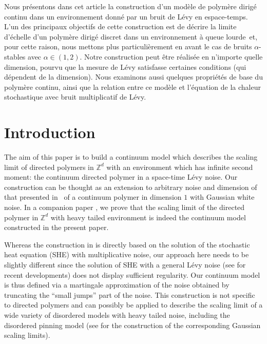 \documentclass[JEP,XML,SOM,Unicode,published]{cedram}
\theoremstyle{definition}
\newcommand{\bbZ}{{\ensuremath{\mathbb Z}} }
\begin{document}
\begin{altabstract}
Nous présentons dans cet article la construction d’un modèle de polymère dirigé continu dans un environnement donné par un bruit de Lévy en espace-temps. L’un des principaux objectifs de cette construction est de décrire la limite d’échelle d'un polymère dirigé discret dans un environnement à queue lourde~et, pour cette raison, nous mettons plus particulièrement en avant le cas de bruits $\alpha$-stables avec $\alpha \in (1,2)$. Notre construction peut être réalisée en n’importe quelle dimension, pourvu que la mesure de Lévy satisfasse certaines conditions (qui dépendent de la dimension). Nous examinons aussi quelques propriétés de base du polymère continu, ainsi que la relation entre ce modèle et l’équation de la chaleur stochastique avec bruit multiplicatif de Lévy.
\end{altabstract}
\maketitle
\vspace*{-\baselineskip}
\enlargethispage{.5\baselineskip}
{\let\\ \relax \tableofcontents}


\section{Introduction}

The aim of this paper is to build a continuum model which describes the scaling limit of directed polymers in $\bbZ^d$ with an environment which has infinite second moment:
the continuum directed polymer in a space-time Lévy noise.
Our construction can be thought as an extension to arbitrary noise and dimension of that presented in~\cite{AKQ14b} of a continuum polymer in dimension $1$ with Gaussian white noise.
In a companion paper \cite{BL20_disc}, we prove that the scaling limit of the directed polymer in $\bbZ^d$ with heavy tailed environment is indeed the continuum model constructed in the present paper.

Whereas the construction in \cite{AKQ14b} is directly based on the solution of the stochastic heat equation (SHE) with multiplicative noise, our approach here needs to be slightly different since the solution of SHE with a general Lévy noise (see \cite{Chong17} for recent developments) does not display sufficient regularity. Our continuum model is thus defined via a martingale approximation of the noise obtained by truncating the ``small jumps'' part of the noise. This construction is not specific to directed polymers and can possibly be applied to describe the scaling limit of a wide variety of disordered models with heavy tailed noise, including the disordered pinning model (see \cite{CSZ14,CSZ13} for the construction of the corresponding Gaussian scaling limits).
\end{document}

